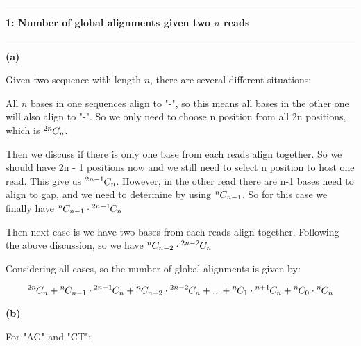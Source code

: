 \documentclass[11pt]{article}
\newcommand*{\permcomb}[4][0mu]{{{}^{#3}\mkern#1#2_{#4}}}
\newcommand*{\comb}[1][-1mu]{\permcomb[#1]{C}}
\newcommand\question[2]{\vspace{.25in}\hrule\textbf{#1: #2}\vspace{.5em}\hrule\vspace{.10in}}
\renewcommand\part[1]{\vspace{.10in}\textbf{(#1)}}
\begin{document}
\raggedright
\newcommand\NAME{Nan Du}  %
\newcommand\ANDREWID{dunan}     %
\newcommand\HWNUM{1}              %


\question{1}{Number of global alignments given two $ n $ reads} 

\part{a} 

Given two sequence with length $ n $, there are several different situations: 

All $ n $ bases in one sequences align to "-", so this means all bases in the other one will also align to "-". So we only need to choose n position from all 2n positions, which is $ \comb{2n}{n} $. 

Then we discuss if there is only one base from each reads align together. So we should have 2n - 1 positions now and we still need to select n position to host one read. This give us $ \comb{2n-1}{n} $. However, in the other read there are n-1 bases need to align to gap, and we need to determine by using $ \comb{n}{n - 1} $. So for this case we finally have $\comb{n}{n - 1} \cdot \comb{2n-1}{n} $

Then next case is we have two bases from each reads align together. Following the above discussion, so we have $\comb{n}{n - 2} \cdot \comb{2n-2}{n} $ 

Considering all cases, so the number of global alignments is given by:

\[ \comb{2n}{n} + \comb{n}{n - 1} \cdot \comb{2n-1}{n} + \comb{n}{n - 2} \cdot \comb{2n-2}{n} + ... + \comb{n}{1} \cdot \comb{n+ 1}{n} + \comb{n}{0} \cdot \comb{n}{n} \]

\part{b}

For "AG" and "CT":
\end{document}

